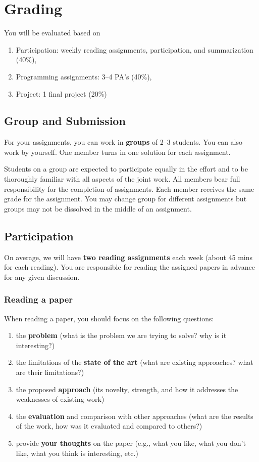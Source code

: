 \documentclass[11pt]{article}
\begin{document}
\section{Grading}
You will be evaluated based on
\begin{enumerate}
\item Participation:  weekly reading assignments, participation, and summarization (40\%),
\item Programming assignments: 3--4 PA's (40\%), 
\item Project: 1 final project  (20\%)
\end{enumerate}

\subsection*{Group and Submission} 
For your assignments, you can work in \textbf{groups} of 2--3 students.  You can also work by yourself. One member turns in one solution for each assignment. 

Students on a group are expected to participate equally in the effort
    and to be thoroughly familiar with all aspects of the joint work.
    All members bear full responsibility for the completion of
    assignments. 
    Each member receives the same grade for the assignment.  You may change group for different assignments but groups may not be dissolved in the middle of an assignment.
\subsection{Participation}
\label{sec:org16c195f}

On average, we will have \textbf{\textbf{two reading assignments}} each week (about 45 mins for each reading). 
You are responsible for reading the assigned papers in advance for any given discussion.

\subsubsection{Reading a paper}\label{sec:reading}
When reading a paper, you should focus on the following questions: 
\begin{enumerate}
    \item the \textbf{problem} (what is the problem we are trying to solve? why is it interesting?)
    \item the limitations of the \textbf{state of the art} (what are existing approaches? what are their limitations?)
    \item the proposed \textbf{approach} (its novelty, strength, and how it  addresses the weaknesses of  existing work)
    \item the \textbf{evaluation} and comparison with other approaches (what are the results of the work, how was it evaluated and compared to others?)
    \item provide \textbf{your thoughts} on the paper (e.g., what you like, what you don't like, what you think is interesting, etc.)
\end{enumerate}
    
\end{document}
